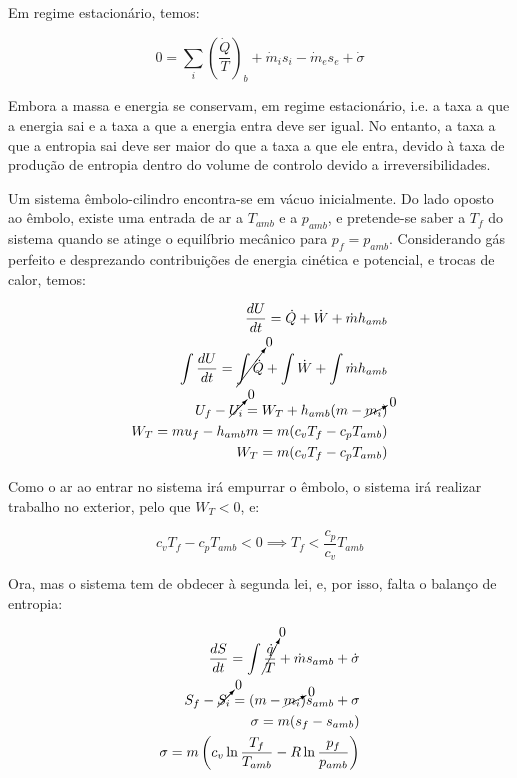 Em regime estacionário, temos:

\begin{equation}
    0 = \sum_i \left( \frac{\dot{Q}}{T} \right)_b + \dot{m}_i s_i - \dot{m}_e s_e + \dot{\sigma}
\end{equation}

Embora a massa e energia se conservam, em regime estacionário, i.e. a taxa a que a energia sai e a taxa a que a energia entra deve ser igual. No entanto, a taxa a que a entropia sai deve ser maior do que a taxa a que ele entra, devido à taxa de produção de entropia dentro do volume de controlo devido a irreversibilidades.

\begin{examplebox}

Um sistema êmbolo-cilindro encontra-se em vácuo inicialmente. Do lado oposto ao êmbolo, existe uma entrada de ar a $T_{amb}$ e a $p_{amb}$, e pretende-se saber a $T_f$ do sistema quando se atinge o equilíbrio mecânico para $p_f = p_{amb}$. Considerando gás perfeito e desprezando contribuições de energia cinética e potencial, e trocas de calor, temos:
    
\begin{eqnarray}
    \frac{dU}{dt} = \dot{Q} + \dot{W} + \dot{m} h_{amb} \\
    \int \frac{dU}{dt} = \cancelto{0}{\int \dot{Q}} + \int \dot{W} + \int \dot{m} h_{amb} \\
    U_f - \cancelto{0}{U_i} = W_T + h_{amb} (m - \cancelto{0}{m_i}) \\
    W_T = m u_f - h_{amb} m = m (c_v T_f - c_p T_{amb}) \\
    W_T = m (c_v T_f - c_p T_{amb}) \\
\end{eqnarray}

Como o ar ao entrar no sistema irá empurrar o êmbolo, o sistema irá realizar trabalho no exterior, pelo que $W_T < 0$, e:

\begin{equation}
    c_v T_f - c_p T_{amb} < 0 \implies T_f < \frac{c_p}{c_v} T_{amb}
\end{equation}

Ora, mas o sistema tem de obdecer à segunda lei, e, por isso, falta o balanço de entropia:

\begin{eqnarray}
    \frac{dS}{dt} = \int \cancelto{0}{\frac{\dot{q}}{T}} + \dot{m} s_{amb} + \dot{\sigma} \\
    S_f - \cancelto{0}{S_i} = (m - \cancelto{0}{m_i}) s_{amb} + \sigma \\
    \sigma = m (s_f - s_{amb}) \\
    \sigma = m \left(c_v \ln \frac{T_f}{T_{amb}} - R \ln \frac{p_f}{p_{amb}} \right)
\end{eqnarray}


\end{examplebox}
